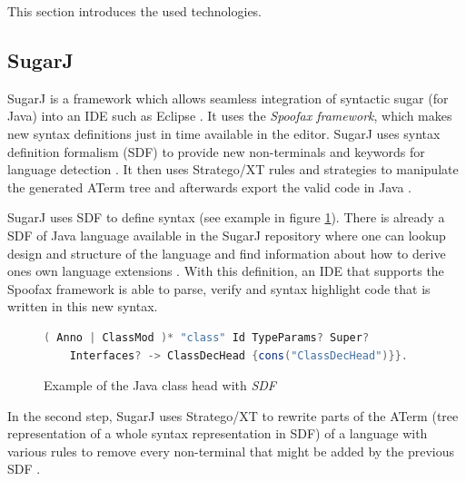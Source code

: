 \documentclass{report}
\begin{document}
This section introduces the used technologies.

\subsection{SugarJ}

SugarJ is a framework which allows seamless integration of syntactic sugar (for Java) into an IDE such as Eclipse \cite{Erdweg-SugarJ-2011}. It uses the \emph{Spoofax framework}, which makes new syntax definitions just in time available in the editor. SugarJ uses syntax definition formalism (SDF) to provide new non-terminals and keywords for language detection \cite{Heering-SDF-1989}. It then uses Stratego/XT rules and strategies to manipulate the generated ATerm tree and afterwards export the valid code in Java \cite{Kats-Spoofax-2010, Brand-ATerms-2000}.

SugarJ uses SDF to define syntax (see example in figure \ref{exampleSDFJavaClassDecHead}). There is already a SDF of Java language available in the SugarJ repository where one can lookup design and structure of the language and find information about how to derive ones own language extensions \cite{Heering-SDF-1989, Brand-SDF-2007, Java-SDF-2014}. With this definition, an IDE that supports the Spoofax framework is able to parse, verify and syntax highlight code that is written in this new syntax.

\begin{figure}[H]
\begin{lstlisting}[language=java,breaklines=false]
( Anno | ClassMod )* "class" Id TypeParams? Super? 
    Interfaces? -> ClassDecHead {cons("ClassDecHead")}}.
\end{lstlisting}
\caption{Example of the Java class head with \emph{SDF} \cite{Java-SDF-2014}}
\label{exampleSDFJavaClassDecHead}
\end{figure}

In the second step, SugarJ uses Stratego/XT to rewrite parts of the ATerm (tree representation of a whole syntax representation in SDF) of a language with various rules to remove every non-terminal that might be added by the previous SDF \cite{Stratego-Manual, Kats-Spoofax-2010, Brand-ATerms-2000, Visser-Stratego-2003}.
\end{document}
